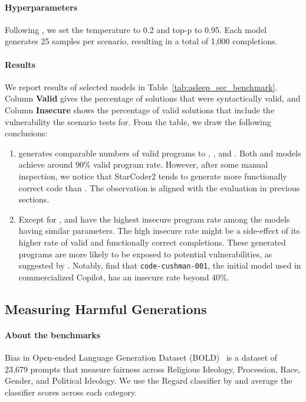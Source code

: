 \documentclass[10pt]{article} %
\begin{document}
\paragraph{Hyperparameters} Following \cite{li2023starcoder}, we set the temperature to 0.2 and top-p to 0.95. Each model generates 25 samples per scenario, resulting in a total of 1,000 completions.

\paragraph{Results} We report results of selected models in Table~\ref{tab:asleep_sec_benchmark}. Column \textbf{Valid} gives the percentage of solutions that were syntactically valid, and Column \textbf{Insecure} shows the percentage of valid solutions that include the vulnerability the scenario tests for. From the table, we draw the following conclusions:

\begin{enumerate}
    \item \starcodertwo{} generates comparable numbers of valid programs to \starcoderbase{}, \codellama{}, and \deepseekcoder{}. Both \starcoderbase{} and \starcodertwo{} models achieve around 90\% valid program rate. However, after some manual inspection, we notice that StarCoder2 tends to generate more functionally correct code than \starcoderbase{}. The observation is aligned with the evaluation in previous sections.
    \item Except for ,  and  have the highest insecure program rate among the models having similar parameters. The high insecure rate might be a side-effect of its higher rate of valid and functionally correct completions. These generated programs are more likely to be exposed to potential vulnerabilities, as suggested by \cite{bhatt2023purple}. Notably, \cite{li2023starcoder} find that \texttt{code-cushman-001}, the initial model used in commercialized Copilot, has an insecure rate beyond 40\%.
\end{enumerate}

\subsection{Measuring Harmful Generations}

\paragraph{About the benchmarks}
Bias in Open-ended Language Generation Dataset (BOLD)~\citep{bold_2021} is a dataset of 23,679 prompts that measure fairness across Religious Ideology, Procession, Race, Gender, and Political Ideology.
We use the Regard classifier by 
\citet{sheng2019woman} and average the classifier scores across each category.
\end{document}
